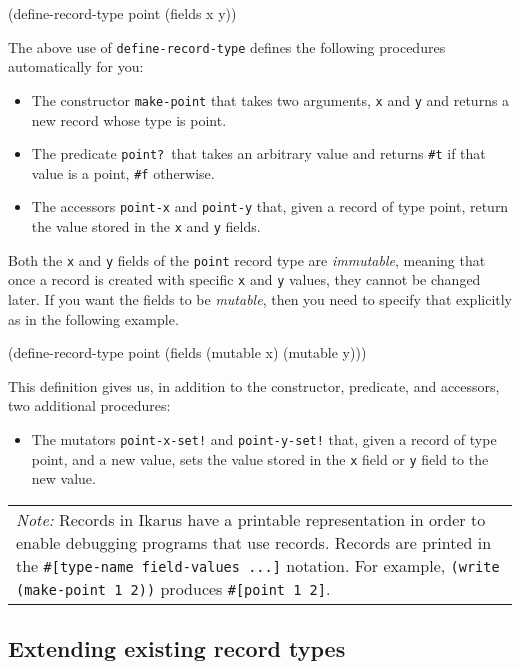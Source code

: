 \documentclass[onecolumn, 12pt, twoside, openright, dvipdfm]{book}
\newcommand{\BoxedText}[2]{
  \vspace{.05in}
  \begin{center}
    \begin{tabular}{|p{4.6in}|} {\large \emph{#1}} #2 \end{tabular}
  \end{center}
  \vspace{.05in}
}
\begin{document}
\begin{CodeInline}
(define-record-type point
  (fields x y))
\end{CodeInline}

The above use of \texttt{define-record-type} defines the following
procedures automatically for you:
\begin{itemize}
\item The constructor \texttt{make-point} that takes two arguments,
\texttt{x} and \texttt{y} and returns a new record whose type is
point.
\item The predicate \texttt{point?}\ that takes an arbitrary value
and returns \texttt{\#t} if that value is a point, \texttt{\#f}
otherwise. 
\item The accessors \texttt{point-x} and \texttt{point-y} that,
given a record of type point, return the value stored in the
\texttt{x} and \texttt{y} fields.
\end{itemize}

Both the \texttt{x} and \texttt{y} fields of the \texttt{point}
record type are \emph{immutable}, meaning that once a record is
created with specific \texttt{x} and \texttt{y} values, they cannot
be changed later.  If you want the fields to be \emph{mutable}, then
you need to specify that explicitly as in the following example.
\newpage

\begin{CodeInline}
(define-record-type point
  (fields (mutable x) (mutable y)))
\end{CodeInline}

This definition gives us, in addition to the constructor, predicate,
and accessors, two additional procedures:
\begin{itemize}
\item The mutators \texttt{point-x-set!} and \texttt{point-y-set!} that,
given a record of type point, and a new value, sets the value stored in the
\texttt{x} field or \texttt{y} field to the new value.
\end{itemize}


\BoxedText{Note:}{Records in Ikarus have a printable representation
in order to enable debugging programs that use records.  Records are
printed in the \texttt{\#[type-name field-values ...]} notation.
For example, \texttt{(write (make-point 1 2))} produces 
\texttt{\#[point 1 2]}.}

\subsection{Extending existing record types}
\end{document}
